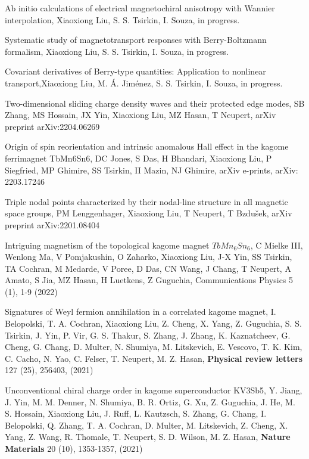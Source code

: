 \documentclass[11pt,a4paper,sans]{moderncv} %
\begin{document}
\begin{etaremune}
  \item Ab initio calculations of electrical magnetochiral anisotropy with Wannier interpolation, \textcolor{cvblue}{Xiaoxiong Liu}, S. S. Tsirkin, I. Souza, in progress.
  \item Systematic study of magnetotransport responses with Berry-Boltzmann formalism, \textcolor{cvblue}{Xiaoxiong Liu}, S. S. Tsirkin, I. Souza, in progress.
  \item Covariant derivatives of Berry-type quantities: Application to nonlinear transport,\textcolor{cvblue}{Xiaoxiong Liu}, M. Á. Jiménez, S. S. Tsirkin, I. Souza, in progress.
  \item Two-dimensional sliding charge density waves and their protected edge modes, SB Zhang, MS Hossain, JX Yin, \textcolor{cvblue}{Xiaoxiong Liu}, MZ Hasan, T Neupert, arXiv preprint arXiv:2204.06269
  \item Origin of spin reorientation and intrinsic anomalous Hall effect in the kagome ferrimagnet TbMn6Sn6, DC Jones, S Das, H Bhandari, \textcolor{cvblue}{Xiaoxiong Liu}, P Siegfried, MP Ghimire, SS Tsirkin, II Mazin, NJ Ghimire, arXiv e-prints, arXiv: 2203.17246
  \item Triple nodal points characterized by their nodal-line structure in all magnetic space groups, PM Lenggenhager, \textcolor{cvblue}{Xiaoxiong Liu}, T Neupert, T Bzdušek, arXiv preprint arXiv:2201.08404
  \item Intriguing magnetism of the topological kagome magnet $TbMn_6Sn_6$, C Mielke III, Wenlong Ma, V Pomjakushin, O Zaharko, \textcolor{cvblue}{Xiaoxiong Liu}, J-X Yin, SS Tsirkin, TA Cochran, M Medarde, V Poree, D Das, CN Wang, J Chang, T Neupert, A Amato, S Jia, MZ Hasan, H Luetkens, Z Guguchia, Communications Physics 5 (1), 1-9 (2022)
  \item Signatures of Weyl fermion annihilation in a correlated kagome magnet, I. Belopolski, T. A. Cochran, \textcolor{cvblue}{Xiaoxiong Liu}, Z. Cheng, X. Yang, Z. Guguchia, S. S. Tsirkin, J. Yin, P. Vir, G. S. Thakur, S. Zhang, J. Zhang, K. Kaznatcheev, G. Cheng, G. Chang, D. Multer, N. Shumiya, M. Litskevich, E. Vescovo, T. K. Kim, C. Cacho, N. Yao, C. Felser, T. Neupert, M. Z. Hasan, \textbf{Physical review letters} 127 (25), 256403, (2021)
  \item Unconventional chiral charge order in kagome superconductor KV3Sb5, Y. Jiang, J. Yin, M. M. Denner, N. Shumiya, B. R. Ortiz, G. Xu, Z. Guguchia, J. He, M. S. Hossain, \textcolor{cvblue}{Xiaoxiong Liu}, J. Ruff, L. Kautzsch, S. Zhang, G. Chang, I. Belopolski, Q. Zhang, T. A. Cochran, D. Multer, M. Litskevich, Z. Cheng, X. Yang, Z. Wang, R. Thomale, T. Neupert, S. D. Wilson, M. Z. Hasan, \textbf{Nature Materials} 20 (10), 1353-1357, (2021)

\end{etaremune}
\end{document}

